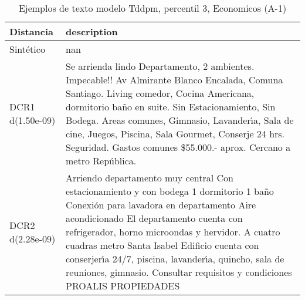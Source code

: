 \begin{table}[H]
\centering
\fontsize{10}{14}\selectfont
\caption{Ejemplos de texto modelo Tddpm, percentil 3, Economicos (A-1)}
\label{table-example-economicos-a-1-tddpm_mlp-3p-text}
\begin{tabular}{|l|m{35em}|}
\hline
\rowcolor[gray]{0.8}
Distancia & description \\
\hline Sintético & nan \\
\hline DCR1 d(1.50e-09) & Se arrienda lindo Departamento, 2 ambientes. Impecable!! Av Almirante Blanco Encalada, Comuna Santiago. Living comedor, Cocina Americana, dormitorio ba\~no en suite. Sin Estacionamiento, Sin Bodega. Areas comunes, Gimnasio, Lavander{\'\i}a, Sala de cine, Juegos, Piscina, Sala Gourmet, Conserje 24 hrs. Seguridad. Gastos comunes \$55.000.- aprox. Cercano a metro Rep\'ublica. \\
\hline DCR2 d(2.28e-09) & Arriendo departamento muy central Con estacionamiento y con bodega 1 dormitorio 1 ba\~no Conexi\'on para lavadora en departamento Aire acondicionado El departamento cuenta con refrigerador, horno microondas y hervidor. A cuatro cuadras metro Santa Isabel Edificio cuenta con conserjer{\'\i}a 24/7, piscina, lavander{\'\i}a, quincho, sala de reuniones, gimnasio.  Consultar requisitos y condiciones  PROALIS PROPIEDADES \\
\hline
\end{tabular}
\end{table}

